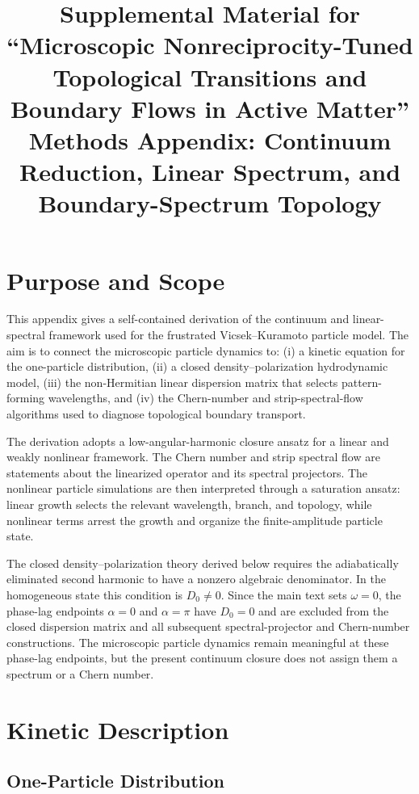 \documentclass[11pt]{article}
\title{Supplemental Material for ``Microscopic Nonreciprocity-Tuned Topological Transitions and Boundary Flows in Active Matter''\\[0.4em]
\large Methods Appendix: Continuum Reduction, Linear Spectrum, and Boundary-Spectrum Topology}
\author{}
\date{}
\numberwithin{equation}{section}
\begin{document}
\maketitle

\section{Purpose and Scope}

This appendix gives a self-contained derivation of the continuum and
linear-spectral framework used for the frustrated Vicsek--Kuramoto
particle model. The aim is to connect the microscopic particle dynamics
to: (i) a kinetic equation for the one-particle distribution, (ii) a
closed density--polarization hydrodynamic model, (iii) the non-Hermitian
linear dispersion matrix that selects pattern-forming wavelengths, and
(iv) the Chern-number and strip-spectral-flow algorithms used to diagnose
topological boundary transport.

The derivation adopts a low-angular-harmonic closure ansatz for a linear
and weakly nonlinear framework. The Chern number and strip spectral flow are statements about
the linearized operator and its spectral projectors. The nonlinear
particle simulations are then interpreted through a saturation ansatz:
linear growth selects the relevant wavelength, branch, and topology, while
nonlinear terms arrest the growth and organize the finite-amplitude
particle state.

The closed density--polarization theory derived below requires the
adiabatically eliminated second harmonic to have a nonzero algebraic
denominator. In the homogeneous state this condition is $D_0\ne0$. Since
the main text sets $\omega=0$, the phase-lag endpoints $\alpha=0$ and $\alpha=\pi$
have $D_0=0$ and are excluded from the closed dispersion matrix and all
subsequent spectral-projector and Chern-number constructions. The
microscopic particle dynamics remain meaningful at these phase-lag endpoints, but
the present continuum closure does not assign them a spectrum or a Chern
number.

\section{Kinetic Description}

\subsection{One-Particle Distribution}
\end{document}
